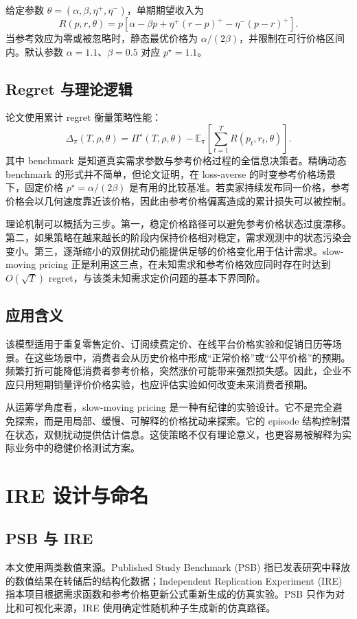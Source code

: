 \documentclass[conference]{../../LaTex_Template/IEEEtran}
\begin{document}
给定参数 $\theta=(\alpha,\beta,\eta^+,\eta^-)$，单期期望收入为
\begin{equation}
R(p,r,\theta)=p\left[\alpha-\beta p+\eta^+(r-p)^+-\eta^-(p-r)^+\right].
\end{equation}
当参考效应为零或被忽略时，静态最优价格为 $\alpha/(2\beta)$，并限制在可行价格区间内。默认参数 $\alpha=1.1$、$\beta=0.5$ 对应 $p^\star=1.1$。

\subsection{Regret 与理论逻辑}
论文使用累计 regret 衡量策略性能：
\begin{equation}
\Delta_\pi(T,\rho,\theta)=\Pi^\star(T,\rho,\theta)
-\mathbb{E}_\pi\left[\sum_{t=1}^T R(p_t,r_t,\theta)\right].
\end{equation}
其中 benchmark 是知道真实需求参数与参考价格过程的全信息决策者。精确动态 benchmark 的形式并不简单，但论文证明，在 loss-averse 的时变参考价格场景下，固定价格 $p^\star=\alpha/(2\beta)$ 是有用的比较基准。若卖家持续发布同一价格，参考价格会以几何速度靠近该价格，因此由参考价格偏离造成的累计损失可以被控制。

理论机制可以概括为三步。第一，稳定价格路径可以避免参考价格状态过度漂移。第二，如果策略在越来越长的阶段内保持价格相对稳定，需求观测中的状态污染会变小。第三，逐渐缩小的双侧扰动仍能提供足够的价格变化用于估计需求。slow-moving pricing 正是利用这三点，在未知需求和参考价格效应同时存在时达到 $O(\sqrt{T})$ regret，与该类未知需求定价问题的基本下界同阶。

\subsection{应用含义}
该模型适用于重复零售定价、订阅续费定价、在线平台价格实验和促销日历等场景。在这些场景中，消费者会从历史价格中形成“正常价格”或“公平价格”的预期。频繁打折可能降低消费者参考价格，突然涨价可能带来强烈损失感。因此，企业不应只用短期销量评价价格实验，也应评估实验如何改变未来消费者预期。

从运筹学角度看，slow-moving pricing 是一种有纪律的实验设计。它不是完全避免探索，而是用局部、缓慢、可解释的价格扰动来探索。它的 episode 结构控制潜在状态，双侧扰动提供估计信息。这使策略不仅有理论意义，也更容易被解释为实际业务中的稳健价格测试方案。

\section{IRE 设计与命名}
\subsection{PSB 与 IRE}
本文使用两类数值来源。Published Study Benchmark (PSB) 指已发表研究中释放的数值结果在转储后的结构化数据；Independent Replication Experiment (IRE) 指本项目根据需求函数和参考价格更新公式重新生成的仿真实验。PSB 只作为对比和可视化来源，IRE 使用确定性随机种子生成新的仿真路径。
\end{document}
